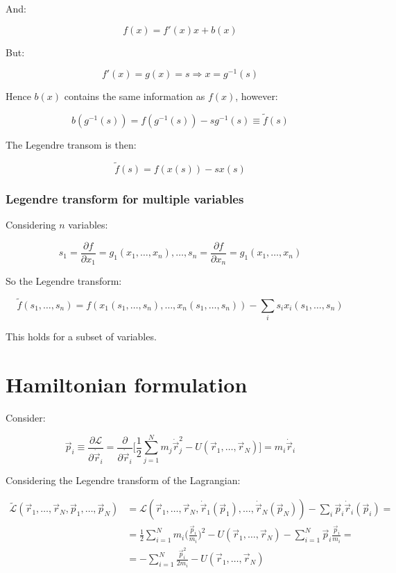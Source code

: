 	And:

	$$f(x) = f'(x)x+b(x)$$

	But:

	$$f'(x) = g(x) = s \Rightarrow x = g^{-1}(s)$$

	Hence $b(x)$ contains the same information as $f(x)$, however:

	$$b(g^{-1}(s)) = f(g^{-1}(s))-sg^{-1}(s) \equiv\tilde{f}(s)$$

	The Legendre transom is then:

	$$\tilde{f}(s) = f(x(s))-sx(s)$$

		\subsubsection{Legendre transform for multiple variables}
		Considering $n$ variables:

		$$s_1 = \frac{\partial f}{\partial x_1} = g_1(x_1, \dots, x_n), \dots, s_n = \frac{\partial f}{\partial x_n} = g_1(x_1, \dots, x_n)$$

		So the Legendre transform:

		$$\tilde{f}(s_1, \dots, s_n) = f(x_1(s_1, \dots, s_n), \dots, x_n(s_1, \dots, s_n))-\sum\limits_i s_ix_i(s_1, \dots, s_n)$$

		This holds for a subset of variables.

\section{Hamiltonian formulation}
Consider:

$$\vec{p}_i\equiv\frac{\partial\mathcal{L}}{\partial\dot{\vec{r}}_i} = \frac{\partial}{\partial\dot{\vec{r}}_i}\biggl[\frac{1}{2}\sum\limits_{j=1}^Nm_j\dot{\vec{r}}_j^2 - U(\vec{r}_1, \dots, \vec{r}_N)\biggr] = m_i\dot{\vec{r}}_i$$

Considering the Legendre transform of the Lagrangian:

\begin{align*}
	\tilde{\mathcal{L}}(\vec{r}_1, \dots, \vec{r}_N, \vec{p}_1, \dots, \vec{p}_N) &= \mathcal{L}(\vec{r}_1, \dots, \vec{r}_N, \dot{\vec{r}}_1(\vec{p}_1), \dots, \dot{\vec{r}}_N(\vec{p}_N))-\sum\limits_{i}\vec{p}_i\dot{\vec{r}}_i(\vec{p}_i) = \\
																																								&=\frac{1}{2}\sum\limits_{i=1}^Nm_i\biggl(\frac{\vec{p}_i}{m_i}\biggr)^2-U(\vec{r}_1, \dots, \vec{r}_N)-\sum\limits_{i=1}^N\vec{p}_i\frac{\vec{p}_i}{m_i} = \\
																																								&=-\sum\limits_{i=1}^N\frac{\vec{p}_i^2}{2m_i} - U(\vec{r}_1, \dots, \vec{r}_N)
\end{align*}

